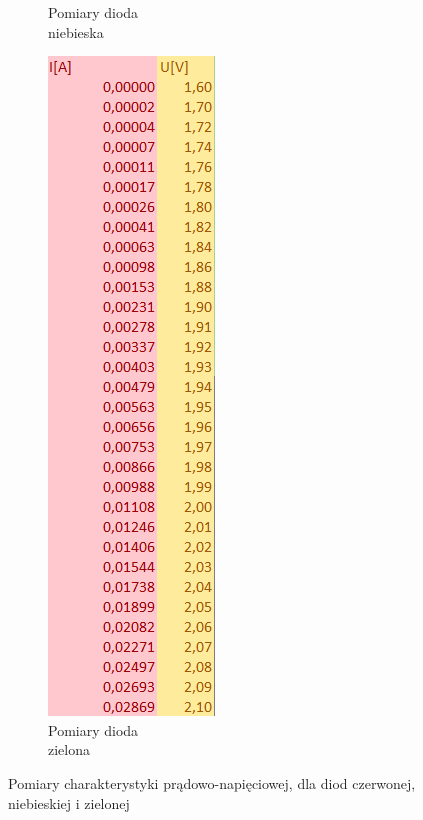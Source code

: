 \documentclass{article}
\begin{document}
\begin{figure}[h!]
\begin{subfigure}[b]{0.2\textwidth}
    \caption{Pomiary dioda\\ niebieska}
  \end{subfigure}
  \begin{subfigure}[b]{0.2\textwidth}
    \includegraphics[width=\linewidth]{Pomiary_Dioda_Zielona.png}
    \caption{Pomiary dioda\\ zielona}
  \end{subfigure}
  \caption{Pomiary charakterystyki prądowo-napięciowej, dla diod czerwonej, niebieskiej i zielonej}
\end{figure}
\end{document}
